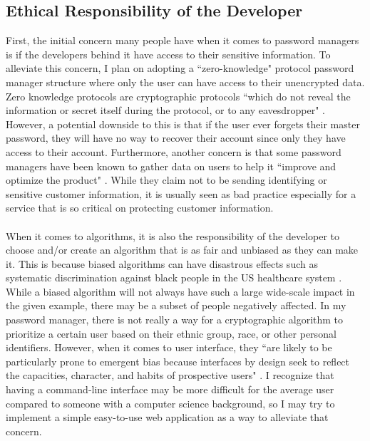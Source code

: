 \documentclass[10pt,twocolumn]{article}
\begin{document}
\subsection{Ethical Responsibility of the Developer}
First, the initial concern many people have when it comes to password managers is if the developers behind it have access to their sensitive information. To alleviate this concern, I plan on adopting a ``zero-knowledge" protocol password manager structure where only the user can have access to their unencrypted data. Zero knowledge protocols are cryptographic protocols ``which do not reveal the information or secret itself during the protocol, or to any eavesdropper" \cite{aronsson1995zero}. However, a potential downside to this is that if the user ever forgets their master password, they will have no way to recover their account since only they have access to their account. Furthermore, another concern is that some password managers have been known to gather data on users to help it ``improve and optimize the product" \cite{porter_2021}. While they claim not to be sending identifying or sensitive customer information, it is usually seen as bad practice especially for a service that is so critical on protecting customer information.
\paragraph{}
When it comes to algorithms, it is also the responsibility of the developer to choose and/or create an algorithm that is as fair and unbiased as they can make it. This is because biased algorithms can have disastrous effects such as systematic discrimination against black people in the US healthcare system \cite{ledford2019millions}. While a biased algorithm will not always have such a large wide-scale impact in the given example, there may be a subset of people negatively affected. In my password manager, there is not really a way for a cryptographic algorithm to prioritize a certain user based on their ethnic group, race, or other personal identifiers. However, when it comes to user interface, they ``are likely to be particularly prone to emergent bias because interfaces by design seek to reflect the capacities, character, and habits of prospective users" \cite{friedman1996bias}. I recognize that having a command-line interface may be more difficult for the average user compared to someone with a computer science background, so I may try to implement a simple easy-to-use web application as a way to alleviate that concern. 
\end{document}
